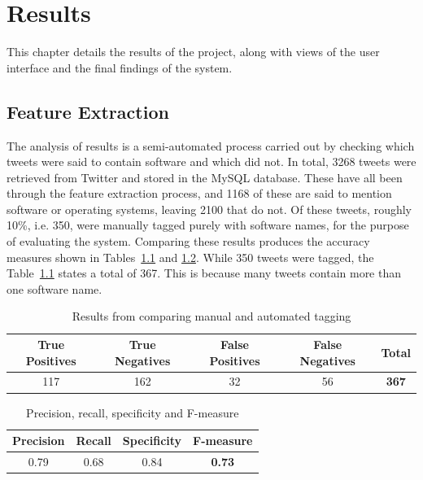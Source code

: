 \chapter{Results}
\label{cha:results}
This chapter details the results of the project, along with views of the user interface and the final findings of the system.

\section{Feature Extraction}
The analysis of results is a semi-automated process carried out by checking which tweets were said to contain software and which did not. In total, 3268 tweets were retrieved from Twitter and stored in the MySQL database. These have all been through the feature extraction process, and 1168 of these are said to mention software or operating systems, leaving 2100 that do not. Of these tweets, roughly 10\%, i.e. 350, were manually tagged purely with software names, for the purpose of evaluating the system. Comparing these results produces the accuracy measures shown in Tables~\ref{tbl:truefalse} and \ref{tbl:measures}. While 350 tweets were tagged, the Table~\ref{tbl:truefalse} states a total of 367. This is because many tweets contain more than one software name.

\begin{table}[h]
\begin{center}
\begin{tabular}{|c|c|c|c|c|}\hline
True Positives&True Negatives&False Positives&False Negatives&\textbf{Total}\\\hline
117&162&32&56&\textbf{367}\\\hline
\end{tabular}
\end{center}
\caption{Results from comparing manual and automated tagging}
\label{tbl:truefalse}
\end{table}

\begin{table}[h]
\begin{center}
\begin{tabular}{|c|c|c|c|}\hline
Precision&Recall&Specificity&\textbf{F-measure}\\\hline
0.79&0.68&0.84&\textbf{0.73}\\\hline
\end{tabular}
\end{center}
\caption{Precision, recall, specificity and F-measure}
\label{tbl:measures}
\end{table}

